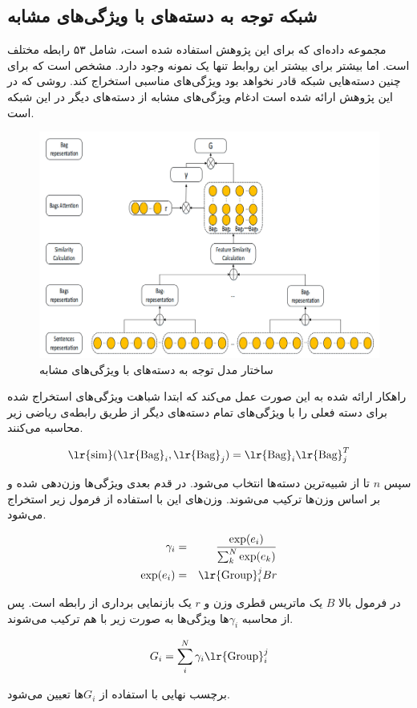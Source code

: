 \subsection{شبکه توجه به دسته‌های با ویژگی‌های مشابه}

مجموعه داده‌ای که برای این پژوهش استفاده شده است، شامل ۵۳ رابطه مختلف است. اما بیشتر برای بیشتر این روابط
تنها یک نمونه وجود دارد. مشخص است که برای چنین دسته‌هایی شبکه قادر نخواهد بود ویژگی‌های مناسبی استخراج کند.
روشی که در این پژوهش ارائه شده است ادغام ویژگی‌های مشابه از دسته‌های دیگر در این شبکه است.

\begin{figure}[h]
    \centering
    \includegraphics[width=0.8\linewidth]{images/pos_attension/bag_attension.png}
    \caption{ساختار مدل توجه به دسته‌های با ویژگی‌های مشابه}
    \label{bag_attension}
\end{figure}

راهکار ارائه شده به این صورت عمل می‌کند که ابتدا شباهت ویژگی‌های استخراج شده برای دسته فعلی را با ویژگی‌های
تمام دسته‌های دیگر از طریق رابطه‌ی ریاضی زیر محاسبه می‌کنند.

\begin{eqnarray}
    \text{\lr{sim}}(\text{\lr{Bag}}_i, \text{\lr{Bag}}_j) = \text{\lr{Bag}}_i \text{\lr{Bag}}^T_j
\end{eqnarray}

سپس $n$ تا از شبیه‌ترین دسته‌ها انتخاب می‌شود. در قدم بعدی ویژگی‌ها وزن‌دهی شده و بر اساس وزن‌ها
ترکیب می‌شوند. وزن‌های این با استفاده از فرمول زیر استخراج می‌شود.

\begin{eqnarray}
    \gamma_i & = & \frac{\exp(e_i)}{\sum_{k}^{N} \exp(e_k)} \\
    \exp(e_i) & = & \text{\lr{Group}}_i^{j} B r
\end{eqnarray}

در فرمول بالا $B$ یک ماتریس قطری وزن و $r$ یک بازنمایی برداری از رابطه است. پس از محاسبه $\gamma_i$ها ویژگی‌ها
به صورت زیر با هم ترکیب می‌شوند.

\begin{eqnarray}
    G_i = \sum_{i}^{N} \gamma_i \textrm{\lr{Group}}_i^{j}
\end{eqnarray}

برچسب نهایی با استفاده از $G_i$ها تعیین می‌شود.
